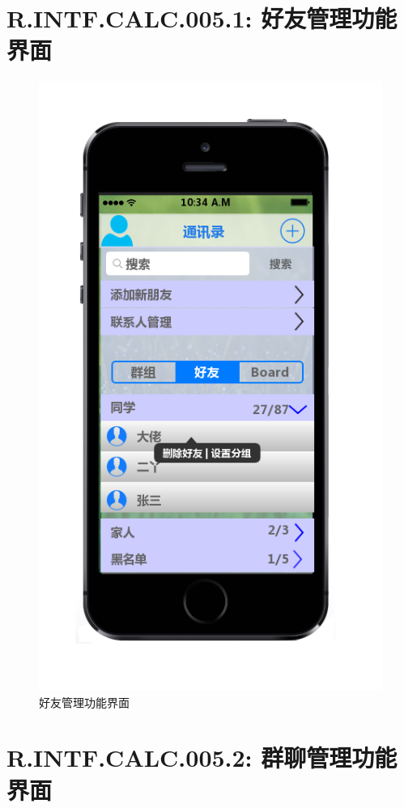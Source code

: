     \section{R.INTF.CALC.005.1: 好友管理功能界面}
    \begin{figure}[h]
        \centering
        \includegraphics[scale=0.6]{OutlineDesign/figures/好友管理功能界面.png}
        \caption{好友管理功能界面}
        \label{fig:server_flow}
    \end{figure}
    \newpage
    \section{R.INTF.CALC.005.2: 群聊管理功能界面}
    
